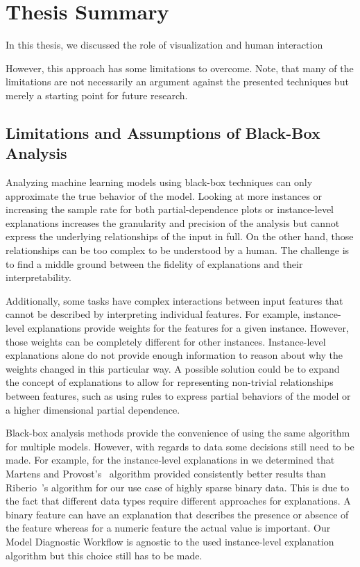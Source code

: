 \chapter{Thesis Summary}
\label{chap:summary}

In this thesis, we discussed the role of visualization and human interaction 

However, this approach has some limitations to overcome.
Note, that many of the limitations are not necessarily an argument against the presented techniques but merely a starting point for future research.

\section{Limitations and Assumptions of Black-Box Analysis}
Analyzing machine learning models using black-box techniques can only approximate the true behavior of the model.
Looking at more instances or increasing the sample rate for both partial-dependence plots or instance-level explanations increases the granularity and precision of the analysis but cannot express the underlying relationships of the input in full.
On the other hand, those relationships can be too complex to be understood by a human.
The challenge is to find a middle ground between the fidelity of explanations and their interpretability.

Additionally, some tasks have complex interactions between input features that cannot be described by interpreting individual features.
For example, instance-level explanations provide weights for the features for a given instance.
However, those weights can be completely different for other instances.
Instance-level explanations alone do not provide enough information to reason about why the weights changed in this particular way.
A possible solution could be to expand the concept of explanations to allow for representing non-trivial relationships between features, such as using rules to express partial behaviors of the model or a higher dimensional partial dependence.

Black-box analysis methods provide the convenience of using the same algorithm for multiple models.
However, with regards to data some decisions still need to be made.
For example, for the instance-level explanations in  we determined that Martens and Provost's~\cite{Martens:2014:EDD:2600518.2600523} algorithm provided consistently better results than Riberio~\etal's\cite{DBLP:journals/corr/RibeiroSG16} algorithm for our use case of highly sparse binary data.
This is due to the fact that different data types require different approaches for explanations.
A binary feature can have an explanation that describes the presence or absence of the feature whereas for a numeric feature the actual value is important.
Our Model Diagnostic Workflow is agnostic to the used instance-level explanation algorithm but this choice still has to be made.

